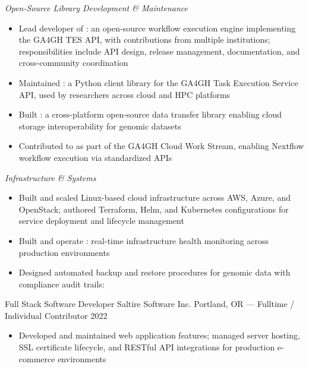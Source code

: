 \vspace{1em}

\emph{Open-Source Library Development \& Maintenance}

\begin{itemize}
    \item Lead developer of : an open-source workflow execution engine implementing the GA4GH TES API, with contributions from multiple institutions; responsibilities include API design, release management, documentation, and cross-community coordination
    \item Maintained : a Python client library for the GA4GH Task Execution Service API, used by researchers across cloud and HPC platforms
    \item Built : a cross-platform open-source data transfer library enabling cloud storage interoperability for genomic datasets
    \item Contributed to  as part of the GA4GH Cloud Work Stream, enabling Nextflow workflow execution via standardized APIs
\end{itemize}

\vspace{1em}

\emph{Infrastructure \& Systems}

\begin{itemize}
    \item Built and scaled Linux-based cloud infrastructure across AWS, Azure, and OpenStack; authored Terraform, Helm, and Kubernetes configurations for service deployment and lifecycle management
    \item Built and operate : real-time infrastructure health monitoring across production environments
    \item Designed automated backup and restore procedures for genomic data with compliance audit trails: 
\end{itemize}

\showoff
{Full Stack Software Developer}
{Saltire Software Inc.}
{Portland, OR --- Fulltime / Individual Contributor}
{2022}

\begin{itemize}
    \item Developed and maintained web application features; managed server hosting, SSL certificate lifecycle, and RESTful API integrations for production e-commerce environments
\end{itemize}


